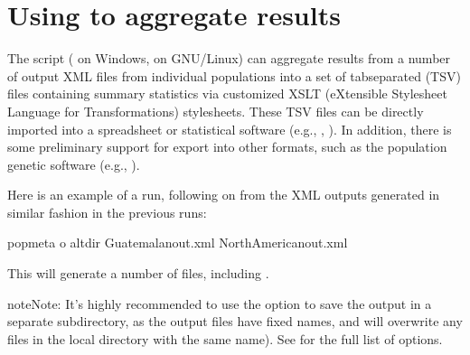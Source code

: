 \documentclass[letterpaper,10pt,english,openany,oneside]{sphinxmanual}
\begin{document}
\section{Using  to aggregate results}
\label{\detokenize{docs/guide-chapter-usage:using-popmeta-to-aggregate-results}}\label{\detokenize{docs/guide-chapter-usage:guide-usage-popmeta}}
\sphinxAtStartPar
The  script ( on Windows,  on
GNU/Linux) can aggregate results from a number of output XML files
from individual populations into a set of tab\sphinxhyphen{}separated (TSV) files
containing summary statistics via customized XSLT (eXtensible
Stylesheet Language for Transformations) stylesheets.  These TSV files
can be directly imported into a spreadsheet or statistical software
(e.g., , ).  In addition, there is some
preliminary support for export into other formats, such as the
population genetic software (e.g., ).

\sphinxAtStartPar
Here is an example of a  run, following on from the XML outputs
generated in similar fashion in the previous  runs:

\begin{sphinxVerbatim}[commandchars=\\\{\}]
popmeta \PYGZhy{}o altdir Guatemalan\PYGZhy{}out.xml NorthAmerican\PYGZhy{}out.xml
\end{sphinxVerbatim}

\sphinxAtStartPar
This will generate a number of  files, including
.

\begin{sphinxadmonition}{note}{Note:}
\sphinxAtStartPar
It’s highly recommended to use the  option to save the output
in a separate subdirectory, as the output  files have
fixed names, and will overwrite any files in the local directory with the
same name).  See {\hyperref[\detokenize{docs/guide-chapter-usage:guide-popmeta-cli}]{}} for the full list of
options.
\end{sphinxadmonition}
\end{document}
